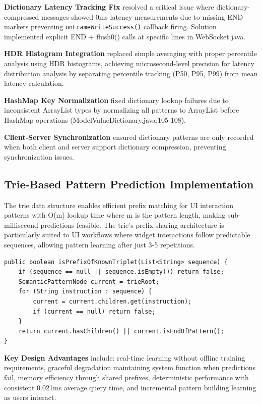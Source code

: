 \documentclass[12pt,a4paper]{article}
\begin{document}
\textbf{Dictionary Latency Tracking Fix} resolved a critical issue where dictionary-compressed messages showed 0ms latency measurements due to missing END markers preventing \texttt{onFrameWriteSuccess()} callback firing. Solution implemented explicit END + flush0() calls at specific lines in WebSocket.java.

\textbf{HDR Histogram Integration} replaced simple averaging with proper percentile analysis using HDR histograms, achieving microsecond-level precision for latency distribution analysis by separating percentile tracking (P50, P95, P99) from mean latency calculation.

\textbf{HashMap Key Normalization} fixed dictionary lookup failures due to inconsistent ArrayList types by normalizing all patterns to ArrayList before HashMap operations (ModelValueDictionary.java:105-108).

\textbf{Client-Server Synchronization} ensured dictionary patterns are only recorded when both client and server support dictionary compression, preventing synchronization issues.

\subsection{Trie-Based Pattern Prediction Implementation}

The trie data structure enables efficient prefix matching for UI interaction patterns with O(m) lookup time where m is the pattern length, making sub-millisecond predictions feasible. The trie's prefix-sharing architecture is particularly suited to UI workflows where widget interactions follow predictable sequences, allowing pattern learning after just 3-5 repetitions.

\begin{lstlisting}[caption=Trie Pattern Matching]
public boolean isPrefixOfKnownTriplet(List<String> sequence) {
    if (sequence == null || sequence.isEmpty()) return false;
    SemanticPatternNode current = trieRoot;
    for (String instruction : sequence) {
        current = current.children.get(instruction);
        if (current == null) return false;
    }
    return current.hasChildren() || current.isEndOfPattern();
}
\end{lstlisting}

\textbf{Key Design Advantages} include: real-time learning without offline training requirements, graceful degradation maintaining system function when predictions fail, memory efficiency through shared prefixes, deterministic performance with consistent 0.021ms average query time, and incremental pattern building learning as users interact.
\end{document}
